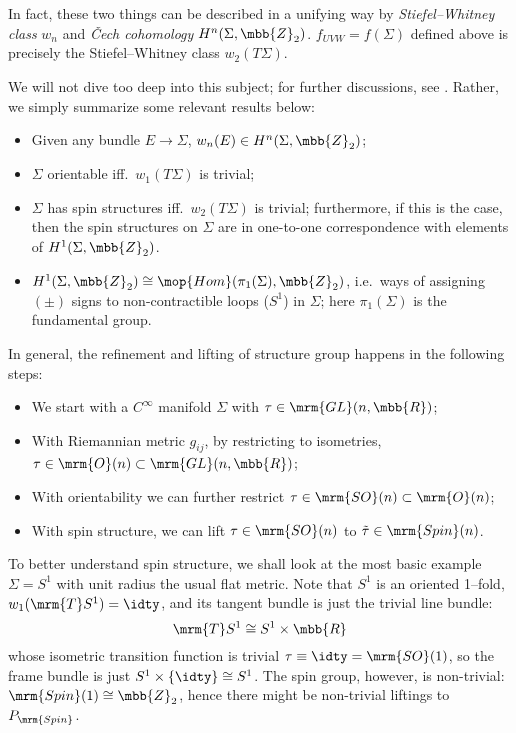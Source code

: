 \documentclass[a4paper,11pt]{article}
\begin{document}
	In fact, these two things can be described in a unifying way by \textit{Stiefel–Whitney class} $w_n$ and \textit{\v{C}ech cohomology} $H^n(\Sigma,\mbb{Z}_2)$. $f_{UVW} = f(\Sigma)$ defined above is precisely the  Stiefel–Whitney class $w_2(T\Sigma)$. 
\pagebreak[3]
	
	We will not dive too deep into this subject; for further discussions, see \cite{Nakahara:2003nw,lawson2016spin}. Rather, we simply summarize some relevant results below:
	\begin{itemize}[noitemsep]
	\item Given any bundle $E\to\Sigma$, $w_n(E)\in H^n(\Sigma,\mbb{Z}_2)$; 
	\item $\Sigma$ orientable iff.~$w_1(T\Sigma)$ is trivial; 
	\item $\Sigma$ has spin structures iff.~$w_2(T\Sigma)$ is trivial; furthermore, if this is the case, then the spin structures on $\Sigma$ are in one-to-one correspondence with elements of $H^1(\Sigma,\mbb{Z}_2)$. 
	\item $H^1(\Sigma,\mbb{Z}_2)\cong \mop{Hom}(\pi_1(\Sigma),\mbb{Z}_2)$, i.e.~ways of assigning $(\pm)$ signs to non-contractible loops ($S^1$) in $\Sigma$; here $\pi_1(\Sigma)$ is the fundamental group. 
	\end{itemize}
	In general, the refinement and lifting of structure group happens in the following steps:
	\begin{itemize}[noitemsep]
	\item We start with a $C^\infty$ manifold $\Sigma$ with $\tau\in\mrm{GL}(n,\mbb{R})$;
	\item With Riemannian metric $g_{ij}$, by restricting to isometries, $\tau\in\mrm{O}(n)\subset\mrm{GL}(n,\mbb{R})$;
	\item With orientability we can further restrict $\tau\in\mrm{SO}(n)\subset\mrm{O}(n)$;
	\item With spin structure, we can lift $\tau\in\mrm{SO}(n)$ to $\tilde{\tau}\in\mrm{Spin}(n)$. 
	\end{itemize}
	
	To better understand spin structure, we shall look at the most basic example $\Sigma = S^1$ with unit radius the usual flat metric. Note that $S^1$ is an oriented 1--fold, $w_1(\mrm{T}S^1) = \idty$, and its tangent bundle is just the trivial line bundle:
	\begin{equation}
		\mrm{T}S^1 \cong S^1\times \mbb{R}
		\label{eq:trivial_S1_bundle}
	\end{equation}
	whose isometric transition function is trivial $\tau\equiv\idty = \mrm{SO}(1)$, so the frame bundle is just $S^1\times\{\idty\}\cong S^1$. The spin group, however, is non-trivial: $\mrm{Spin}(1)\cong\mbb{Z}_2$, hence there might be non-trivial liftings to $P_{\mrm{Spin}}$. 
	
\end{document}
